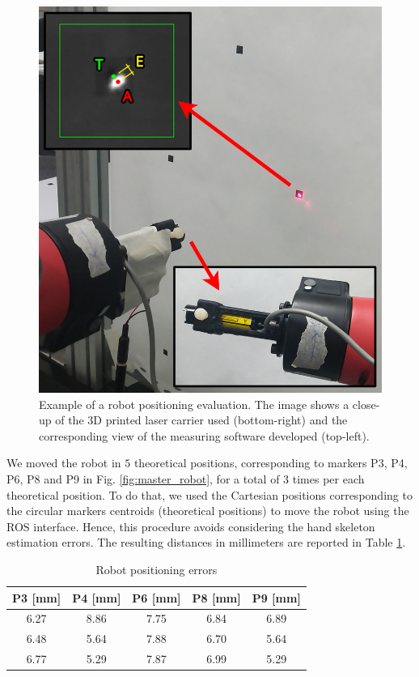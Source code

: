 \documentclass[a4paper, 10 pt, conference]{ieeeconf}      %
\begin{document}
\begin{figure} [ht]
  \centering
  \includegraphics[width=0.7\columnwidth]{figures/lasermount}
  \caption{Example of a robot positioning evaluation. The image shows a close-up of the 3D printed laser carrier used (bottom-right) and the corresponding view of the measuring software developed (top-left).}
  \label{fig:laser}
\end{figure}

We moved the robot in $5$ theoretical positions, corresponding to markers P3, P4, P6, P8 and P9 in Fig. \ref{fig:master_robot}, for a total of $3$ times per each theoretical position. To do that, we used the Cartesian positions corresponding to the circular markers centroids (theoretical positions) to move the robot using the ROS interface. Hence, this procedure avoids considering the hand skeleton estimation errors.
The resulting distances in millimeters are reported in Table \ref{tab:laser}.

\begin{table}[h]
\begin{center}
\caption{Robot positioning errors}
\label{tab:laser}
\begin{tabular}{|c|c||c||c||c|}
\hline
\textbf{P3 [mm]} & \textbf{P4 [mm]} & \textbf{P6 [mm]} & \textbf{P8 [mm]} & \textbf{P9 [mm]} \\
\hline
6.27 & 8.86 &  7.75 & 6.84 & 6.89\\
6.48 & 5.64 & 7.88 & 6.70 & 5.64\\
6.77 & 5.29 & 7.87 & 6.99 & 5.29\\
\hline
\end{tabular}
\end{center}
\end{table}
\end{document}
